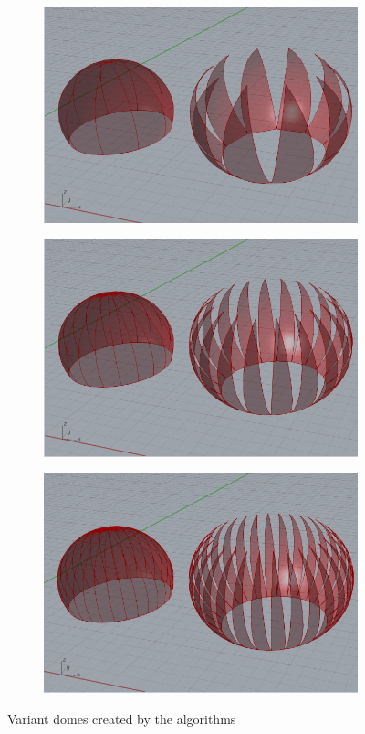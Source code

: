 \documentclass[preprint,12pt,3p]{elsarticle}
\begin{document}
\begin{figure}[h]
\begin{subfigure}{0.3\textwidth}
  \centering
  \includegraphics[width=.9\linewidth]{dome07.png}
  \caption{}
  \label{fig:dome07}
\end{subfigure}
\begin{subfigure}{0.3\textwidth}
  \centering
  \includegraphics[width=.9\linewidth]{dome08.png}
  \caption{}
  \label{fig:dome08}
\end{subfigure}
\begin{subfigure}{0.3\textwidth}
  \centering
  \includegraphics[width=.9\linewidth]{dome09.png}
  \caption{}
  \label{fig:dome09}
\end{subfigure}


\caption{Variant domes created by the algorithms}
\label{fig:domeresult}
\end{figure}
\end{document}
